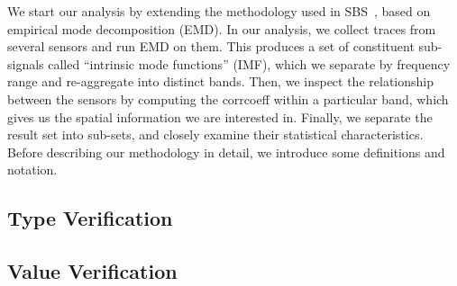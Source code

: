 We start our analysis by extending the methodology used in SBS~\cite{SBS}, based on empirical mode decomposition (EMD).  
In our analysis, we collect traces from several sensors and run EMD on them.  This produces a set of 
constituent sub-signals called ``intrinsic mode functions'' (IMF), which we separate by frequency range and re-aggregate into distinct bands.
Then, we inspect the relationship between the sensors by computing the corrcoeff within a particular band, which 
gives us the spatial information we are interested in. 
Finally, we separate the result set into sub-sets, and closely examine their statistical characteristics. 
Before describing our methodology in detail, we introduce some definitions and notation.



\subsection{Type Verification}



\subsection{Value Verification}




